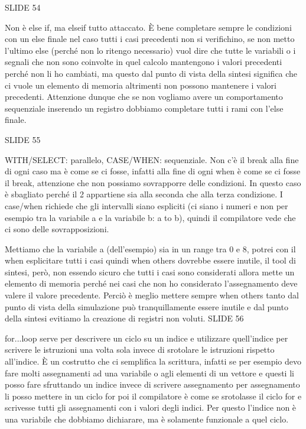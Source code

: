 \documentclass[10pt,a4paper,titlepage]{article}
\begin{document}
SLIDE 54

Non è else if, ma elseif tutto attaccato.
È bene completare sempre le condizioni con un else finale nel caso tutti i casi precedenti non si verifichino, se non metto l’ultimo else (perché non lo ritengo necessario) vuol dire che tutte le variabili o i segnali che non sono coinvolte in quel calcolo mantengono i valori precedenti perché non li ho cambiati, ma questo dal punto di vista della sintesi significa che ci vuole un elemento di memoria altrimenti non possono mantenere i valori precedenti. Attenzione dunque che se non vogliamo avere un comportamento sequenziale inserendo un registro dobbiamo completare tutti i rami con l’else finale. 

SLIDE 55 

WITH/SELECT: parallelo, CASE/WHEN: sequenziale.
Non c’è il break alla fine di ogni caso ma è come se ci fosse, infatti alla fine di ogni when è come se ci fosse il break, attenzione che non possiamo sovrapporre delle condizioni. 
In questo caso è sbagliato perché il 2 appartiene sia alla seconda che alla terza condizione. I case/when richiede che gli intervalli siano espliciti (ci siano i numeri e non per esempio tra la variabile a e la variabile b: a to b), quindi il compilatore vede che ci sono delle sovrapposizioni.  

Mettiamo che la variabile a (dell’esempio) sia in un range tra 0 e 8, potrei con il when esplicitare tutti i casi quindi when others dovrebbe essere inutile, il tool di sintesi, però, non essendo sicuro che tutti i casi sono considerati allora mette un elemento di memoria perché nei casi che non ho considerato l’assegnamento deve valere il valore precedente. Perciò è meglio mettere sempre when others tanto dal punto di vista della simulazione può tranquillamente essere inutile e dal punto della sintesi evitiamo la creazione di registri non voluti.
SLIDE 56

for...loop serve per descrivere un ciclo su un indice e utilizzare quell’indice per scrivere le istruzioni una volta sola invece di srotolare le istruzioni rispetto all’indice. È un costrutto che ci semplifica la scrittura, infatti se per esempio devo fare molti assegnamenti ad una variabile o agli elementi di un vettore e questi li posso fare sfruttando un indice invece di scrivere assegnamento per assegnamento li posso mettere in un ciclo for poi il compilatore è come se srotolasse il ciclo for e scrivesse tutti gli assegnamenti con i valori degli indici. Per questo l’indice non è una variabile che dobbiamo dichiarare, ma è solamente funzionale a quel ciclo.
\end{document}
